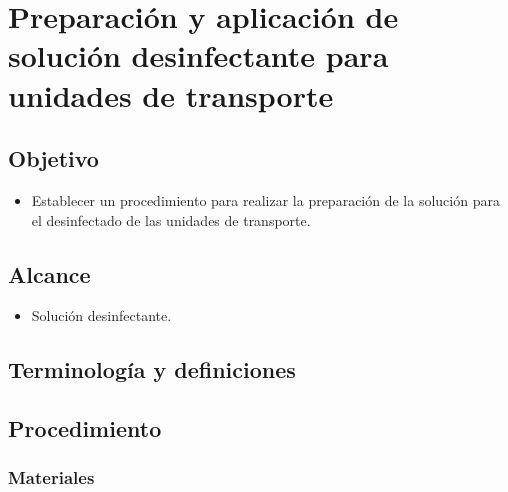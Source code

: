 \thispagestyle{formato-PI}
\renewcommand{\MayorVer}{2}
\renewcommand{\MenorVer}{0}
\renewcommand{\Codigo}{HYS-8-IT}
\renewcommand{\FechaPub}{2023--01}
\renewcommand{\Titulo}{Preparación y aplicación de solución desinfectante para unidades de transporte}

\section{\Titulo}

\subsection{Objetivo}

\begin{itemize}
	\item Establecer un procedimiento para realizar la preparación de la solución para el desinfectado de las unidades de transporte.
\end{itemize}

\subsection{Alcance}

\begin{itemize}
	\item Solución desinfectante.
\end{itemize}

\subsection{Terminología y definiciones}

\begin{description}
\end{description}


\subsection{Procedimiento}

\subsubsection{Materiales}

